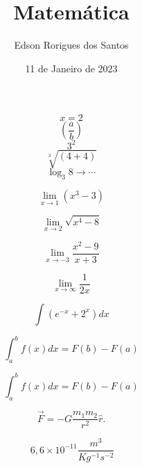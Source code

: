 \documentclass[12pt, a4paper, brazil, oneside]{book}
\title{Matemática}
\author{Edson Rorigues dos Santos}
\date{11 de Janeiro de 2023}
\begin{document}
\maketitle

\begin{equation}
x=2
\end{equation}
\begin{equation}
\left( \frac{a}{b}\right) 
\end{equation}
\begin{equation}
3^{2}
\end{equation}
\begin{equation}
\sqrt[3]{(4+4)}
\end{equation}
\begin{equation}
\log_{3}8  \rightarrow\cdots             
\end{equation}

\begin{equation}
\lim_{x\rightarrow 1}(x^{3}-3)
\end{equation}

\begin{equation}
\lim_{x\rightarrow 2}\sqrt{x^{4}-8}
\end{equation}

\begin{equation}
\lim_{x\rightarrow-3}\frac{x^{2}-9}{x + 3}
\end{equation}

\begin{equation}
\lim_{x\rightarrow\infty}\frac{1}{2x}
\end{equation}

\begin{equation}
\int(e^{-x} + 2^{x})dx
\end{equation}

\begin{equation}
\int_a^b f(x)dx = F(b)- F(a)
\end{equation}

\begin{equation}
\int_{a}^{b} f(x)dx = F(b) - F(a)
\end{equation}


\begin{equation}
\vec{F}= -G\frac{m_1m_2}{r^2}\hat{r}.
\end{equation}

\begin{equation}
\ 6,6 \times  10^{-11} \frac{m^3}{Kg^{-1}s^{-2}}
\end{equation}
\end{document}
